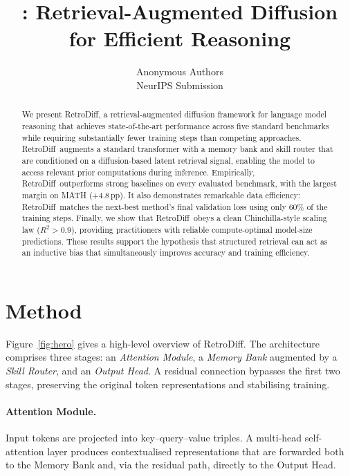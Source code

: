 \documentclass[10pt,twocolumn]{article}
\title{\textbf{\methodname}: Retrieval-Augmented Diffusion\\for Efficient Reasoning}
\author{Anonymous Authors\\
\small NeurIPS Submission}
\date{}
\newcommand{\methodname}{RetroDiff}
\begin{document}
\maketitle

\begin{abstract}
We present \methodname, a retrieval-augmented diffusion framework for language model
reasoning that achieves state-of-the-art performance across five standard benchmarks
while requiring substantially fewer training steps than competing approaches.
\methodname\ augments a standard transformer with a memory bank and skill router
that are conditioned on a diffusion-based latent retrieval signal, enabling the model
to access relevant prior computations during inference.
Empirically, \methodname\ outperforms strong baselines on every evaluated benchmark,
with the largest margin on MATH (+4.8\,pp).
It also demonstrates remarkable data efficiency: \methodname\ matches the next-best
method's final validation loss using only 60\% of the training steps.
Finally, we show that \methodname\ obeys a clean Chinchilla-style scaling law
($R^{2}{>}0.9$), providing practitioners with reliable compute-optimal model-size
predictions.
These results support the hypothesis that structured retrieval can act as an
inductive bias that simultaneously improves accuracy and training efficiency.
\end{abstract}

\section{Method}
\label{sec:method}

Figure~\ref{fig:hero} gives a high-level overview of \methodname.
The architecture comprises three stages: an \emph{Attention Module},
a \emph{Memory Bank} augmented by a \emph{Skill Router},
and an \emph{Output Head}.
A residual connection bypasses the first two stages, preserving the original
token representations and stabilising training.

\paragraph{Attention Module.}
Input tokens are projected into key–query–value triples.
A multi-head self-attention layer produces contextualised representations
that are forwarded both to the Memory Bank and, via the residual path,
directly to the Output Head.
\end{document}
